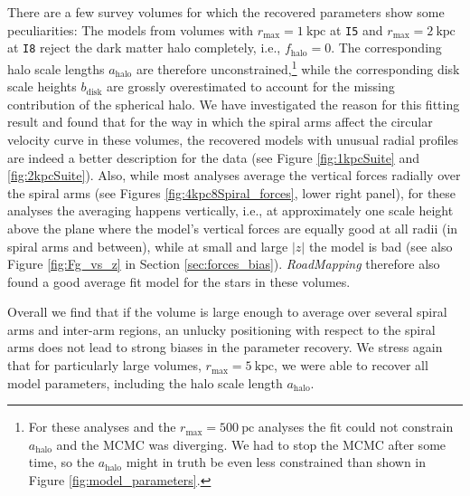 \documentclass[iop,revtex4,numberedappendix,appendixfloats]{emulateapj}
\newcommand{\RM}{{\sl RoadMapping}}
\begin{document}
There are a few survey volumes for which the recovered parameters show some peculiarities: The models from volumes with $r_\text{max}=1~\text{kpc}$ at \texttt{I5} and $r_\text{max}=2~\text{kpc}$ at \texttt{I8} reject the dark matter halo completely, i.e., $f_\text{halo}=0$. The corresponding halo scale lengths $a_\text{halo}$ are therefore unconstrained,\footnote{For these analyses and the $r_\text{max}=500~\text{pc}$ analyses the fit could not constrain $a_\text{halo}$ and the MCMC was diverging. We had to stop the MCMC after some time, so the $a_\text{halo}$ might in truth be even less constrained than shown in Figure \ref{fig:model_parameters}.} while the corresponding disk scale heights $b_\text{disk}$ are grossly overestimated to account for the missing contribution of the spherical halo. We have investigated the reason for this fitting result and found that for the way in which the spiral arms affect the circular velocity curve in these volumes, the recovered models with unusual radial profiles are indeed a better description for the data (see Figure \ref{fig:1kpcSuite} and \ref{fig:2kpcSuite}). Also, while most analyses average the vertical forces radially over the spiral arms (see Figures \ref{fig:4kpc8Spiral_forces}, lower right panel), for these analyses the averaging happens vertically, i.e., at approximately one scale height above the plane where the model's vertical forces are equally good at all radii (in spiral arms and between), while at small and large $|z|$ the model is bad (see also Figure \ref{fig:Fg_vs_z} in Section \ref{sec:forces_bias}). \RM{} therefore also found a good average fit model for the stars in these volumes. 

Overall we find that if the volume is large enough to average over several spiral arms and inter-arm regions, an unlucky positioning with respect to the spiral arms does not lead to strong biases in the parameter recovery. We stress again that for particularly large volumes, $r_\text{max}=5~\text{kpc}$, we were able to recover all model parameters, including the halo scale length $a_\text{halo}$.
\end{document}
